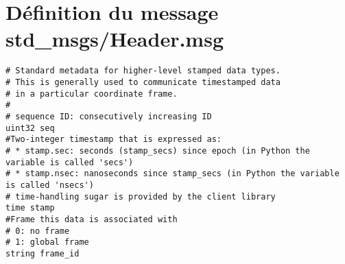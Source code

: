 \section{Définition du message std\_msgs/Header.msg}

\begin{lstlisting}[style = custombash]
# Standard metadata for higher-level stamped data types.
# This is generally used to communicate timestamped data 
# in a particular coordinate frame.
# 
# sequence ID: consecutively increasing ID 
uint32 seq
#Two-integer timestamp that is expressed as:
# * stamp.sec: seconds (stamp_secs) since epoch (in Python the variable is called 'secs')
# * stamp.nsec: nanoseconds since stamp_secs (in Python the variable is called 'nsecs')
# time-handling sugar is provided by the client library
time stamp
#Frame this data is associated with
# 0: no frame
# 1: global frame
string frame_id
\end{lstlisting}